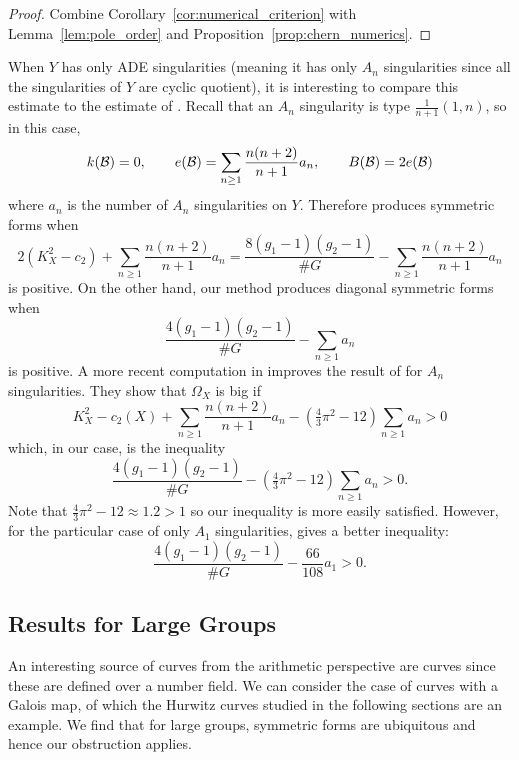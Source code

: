 \documentclass[main.tex]{subfiles}
\begin{document}
\begin{proof}
Combine Corollary~\ref{cor:numerical_criterion} with Lemma~\ref{lem:pole_order} and Proposition~\ref{prop:chern_numerics}.
\end{proof}

When $Y$ has only ADE singularities (meaning it has only $A_n$ singularities since all the singularities of $Y$ are cyclic quotient), it is interesting to compare this estimate to the estimate of \cite{roulleau:canonical_sheaves}. Recall that an $A_n$ singularity is type $\frac{1}{n+1}(1, n)$, so in this case,
\[ k(\mathcal{B}) = 0, \quad \quad e(\mathcal{B}) = \sum_{n \ge 1} \frac{n(n+2)}{n+1} a_n, \quad \quad B(\mathcal{B}) = 2 e(\mathcal{B})  \]
where $a_n$ is the number of $A_n$ singularities on $Y$. Therefore \cite{roulleau:canonical_sheaves} produces symmetric forms when
\[ 2(K_X^2 - c_2) + \sum_{n \ge 1} \frac{n(n+2)}{n+1} a_n = \frac{8(g_1 - 1)(g_2 - 1)}{\# G} - \sum_{n \ge 1} \frac{n(n+2)}{n+1} a_n  \]
is positive. 
On the other hand, our method produces diagonal symmetric forms when
\[ \frac{4(g_1 - 1)(g_2 - 1)}{\# G} - \sum_{n \ge 1} a_n \]
is positive. A more recent computation in \cite{bruin:an-singularities} improves the result of \cite{roulleau:canonical_sheaves} for $A_n$ singularities. They show that $\Omega_X$ is big if 
\[ K_X^2 - c_2(X) + \sum_{n \ge 1} \frac{n(n+2)}{n+1} a_n - (\tfrac{4}{3} \pi^2 - 12) \sum_{n \ge 1} a_n > 0 \]
which, in our case, is the inequality
\[ \frac{4(g_1 - 1)(g_2 - 1)}{\# G} - (\tfrac{4}{3} \pi^2 - 12) \sum_{n \ge 1} a_n > 0. \]
Note that $\tfrac{4}{3} \pi^2 - 12 \approx 1.2 > 1$ so our inequality is more easily satisfied. However, for the particular case of only $A_1$ singularities, \cite{bruin:an-singularities} gives a better inequality:
\[ \frac{4(g_1 - 1)(g_2 - 1)}{\# G} - \frac{66}{108} a_1 > 0. \]

\subsection{Results for Large Groups}

An interesting source of curves from the arithmetic perspective are \Belyi curves since these are defined over a number field. We can consider the case of curves with a Galois \Belyi map, of which the Hurwitz curves studied in the following sections are an example. We find that for large groups, symmetric forms are ubiquitous and hence our obstruction applies.
\end{document}
